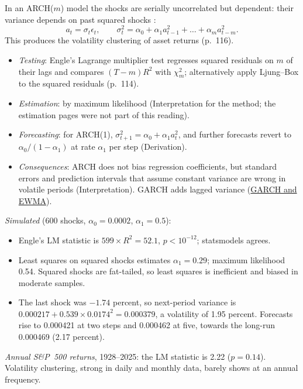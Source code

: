 \begin{qfmodel}\label{mod:arch-conditional-variance}
 In an ARCH($m$) model the shocks are serially uncorrelated but dependent: their variance depends on past squared shocks \citep[pp.~115--116]{s7-tsay}:
\[ a_t=\sigma_t\epsilon_t,\qquad \sigma_t^2=\alpha_0+\alpha_1a_{t-1}^2+\dots+\alpha_ma_{t-m}^2. \]
This produces the volatility clustering of asset returns (p.~116).
\begin{itemize}
\item \emph{Testing}: Engle's Lagrange multiplier test regresses squared residuals on $m$ of their lags and compares $(T-m)R^2$ with $\chi^2_m$; alternatively apply Ljung--Box to the squared residuals (p.~114).
\item \emph{Estimation}: by maximum likelihood (Interpretation for the method; the estimation pages were not part of this reading).
\item \emph{Forecasting}: for ARCH(1), $\sigma^2_{t+1}=\alpha_0+\alpha_1a_t^2$, and further forecasts revert to $\alpha_0/(1-\alpha_1)$ at rate $\alpha_1$ per step (Derivation).
\item \emph{Consequences}: ARCH does not bias regression coefficients, but standard errors and prediction intervals that assume constant variance are wrong in volatile periods (Interpretation). GARCH adds lagged variance (\hyperref[mod:garch-volatility-forecast]{GARCH and EWMA}).
\end{itemize}

 \emph{Simulated} (600 shocks, $\alpha_0=0.0002$, $\alpha_1=0.5$):
\begin{itemize}
\item Engle's LM statistic is $599\times R^2=52.1$, $p<10^{-12}$; statsmodels agrees.
\item Least squares on squared shocks estimates $\alpha_1=0.29$; maximum likelihood 0.54. Squared shocks are fat-tailed, so least squares is inefficient and biased in moderate samples.
\item The last shock was $-1.74$ percent, so next-period variance is $0.000217+0.539\times0.0174^2=0.000379$, a volatility of 1.95 percent. Forecasts rise to 0.000421 at two steps and 0.000462 at five, towards the long-run 0.000469 (2.17 percent).
\end{itemize}
\emph{Annual S\&P~500 returns}, 1928--2025: the LM statistic is 2.22 ($p=0.14$). Volatility clustering, strong in daily and monthly data, barely shows at an annual frequency.


\end{qfmodel}
